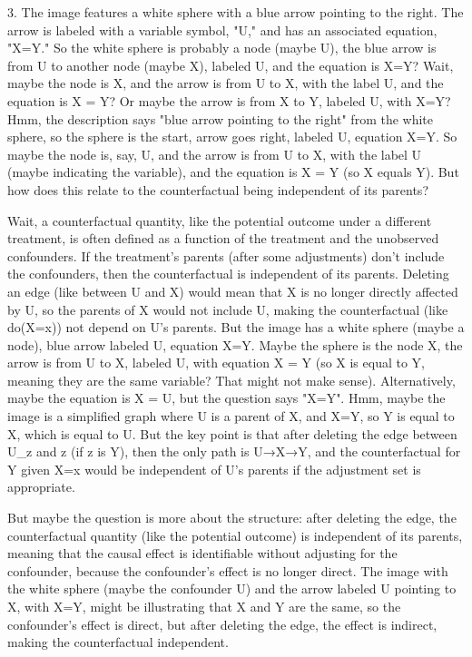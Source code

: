 3. The image features a white sphere with a blue arrow pointing to the right. The arrow is labeled with a variable symbol, "U," and has an associated equation, "X=Y." So the white sphere is probably a node (maybe U), the blue arrow is from U to another node (maybe X), labeled U, and the equation is X=Y? Wait, maybe the node is X, and the arrow is from U to X, with the label U, and the equation is X = Y? Or maybe the arrow is from X to Y, labeled U, with X=Y? Hmm, the description says "blue arrow pointing to the right" from the white sphere, so the sphere is the start, arrow goes right, labeled U, equation X=Y. So maybe the node is, say, U, and the arrow is from U to X, with the label U (maybe indicating the variable), and the equation is X = Y (so X equals Y). But how does this relate to the counterfactual being independent of its parents?

Wait, a counterfactual quantity, like the potential outcome under a different treatment, is often defined as a function of the treatment and the unobserved confounders. If the treatment's parents (after some adjustments) don't include the confounders, then the counterfactual is independent of its parents. Deleting an edge (like between U and X) would mean that X is no longer directly affected by U, so the parents of X would not include U, making the counterfactual (like do(X=x)) not depend on U's parents. But the image has a white sphere (maybe a node), blue arrow labeled U, equation X=Y. Maybe the sphere is the node X, the arrow is from U to X, labeled U, with equation X = Y (so X is equal to Y, meaning they are the same variable? That might not make sense). Alternatively, maybe the equation is X = U, but the question says "X=Y". Hmm, maybe the image is a simplified graph where U is a parent of X, and X=Y, so Y is equal to X, which is equal to U. But the key point is that after deleting the edge between U_z and z (if z is Y), then the only path is U→X→Y, and the counterfactual for Y given X=x would be independent of U's parents if the adjustment set is appropriate.

But maybe the question is more about the structure: after deleting the edge, the counterfactual quantity (like the potential outcome) is independent of its parents, meaning that the causal effect is identifiable without adjusting for the confounder, because the confounder's effect is no longer direct. The image with the white sphere (maybe the confounder U) and the arrow labeled U pointing to X, with X=Y, might be illustrating that X and Y are the same, so the confounder's effect is direct, but after deleting the edge, the effect is indirect, making the counterfactual independent.

